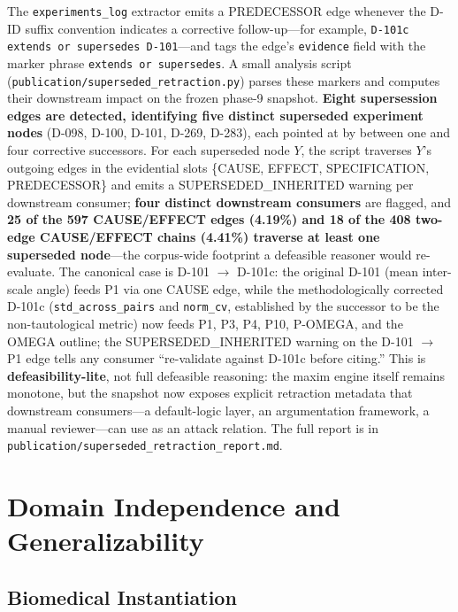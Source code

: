 \documentclass{iosart2x}
\begin{document}
The \texttt{experiments\_log} extractor emits a PREDECESSOR edge whenever the D-ID suffix convention indicates a corrective follow-up---for example, \texttt{D-101c extends or supersedes D-101}---and tags the edge's \texttt{evidence} field with the marker phrase \texttt{extends or supersedes}. A small analysis script (\texttt{publication/superseded\_retraction.py}) parses these markers and computes their downstream impact on the frozen phase-9 snapshot. \textbf{Eight supersession edges are detected, identifying five distinct superseded experiment nodes} (D-098, D-100, D-101, D-269, D-283), each pointed at by between one and four corrective successors. For each superseded node $Y$, the script traverses $Y$'s outgoing edges in the evidential slots \{CAUSE, EFFECT, SPECIFICATION, PREDECESSOR\} and emits a SUPERSEDED\_INHERITED warning per downstream consumer; \textbf{four distinct downstream consumers} are flagged, and \textbf{25 of the 597 CAUSE/EFFECT edges (4.19\%) and 18 of the 408 two-edge CAUSE/EFFECT chains (4.41\%) traverse at least one superseded node}---the corpus-wide footprint a defeasible reasoner would re-evaluate. The canonical case is D-101 $\rightarrow$ D-101c: the original D-101 (mean inter-scale angle) feeds P1 via one CAUSE edge, while the methodologically corrected D-101c (\texttt{std\_across\_pairs} and \texttt{norm\_cv}, established by the successor to be the non-tautological metric) now feeds P1, P3, P4, P10, P-OMEGA, and the OMEGA outline; the SUPERSEDED\_INHERITED warning on the D-101 $\rightarrow$ P1 edge tells any consumer ``re-validate against D-101c before citing.'' This is \textbf{defeasibility-lite}, not full defeasible reasoning: the maxim engine itself remains monotone, but the snapshot now exposes explicit retraction metadata that downstream consumers---a default-logic layer, an argumentation framework, a manual reviewer---can use as an attack relation. The full report is in \texttt{publication/superseded\_retraction\_report.md}.

\section{Domain Independence and Generalizability}
\label{sec:domain}

\subsection{Biomedical Instantiation}
\end{document}
